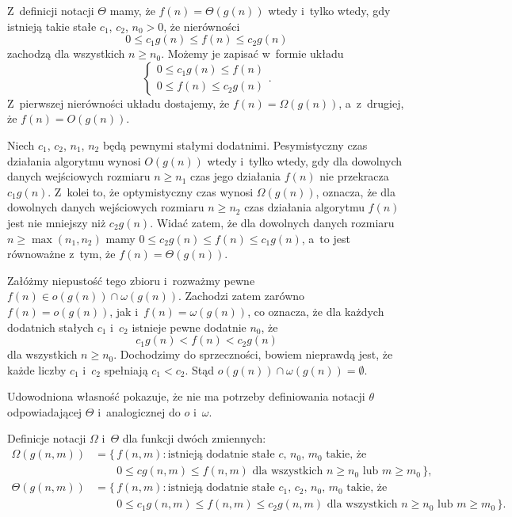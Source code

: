 \exercise %
Z~definicji notacji $\Theta$ mamy, że $f(n)=\Theta(g(n))$ wtedy i~tylko wtedy, gdy istnieją takie stałe $c_1$, $c_2$, $n_0>0$, że nierówności
\[
	0 \le c_1g(n) \le f(n) \le c_2g(n)
\]
zachodzą dla wszystkich $n\ge n_0$.
Możemy je zapisać w~formie układu
\[
	\begin{cases}
		0 \le c_1g(n) \le f(n) \\
		0 \le f(n) \le c_2g(n)
	\end{cases}.
\]
Z~pierwszej nierówności układu dostajemy, że $f(n)=\Omega(g(n))$, a~z~drugiej, że $f(n)=O(g(n))$.

\exercise %
Niech $c_1$, $c_2$, $n_1$, $n_2$ będą pewnymi stałymi dodatnimi.
Pesymistyczny czas działania algorytmu wynosi $O(g(n))$ wtedy i~tylko wtedy, gdy dla dowolnych danych wejściowych rozmiaru $n\ge n_1$ czas jego działania $f(n)$ nie przekracza $c_1g(n)$.
Z~kolei to, że optymistyczny czas wynosi $\Omega(g(n))$, oznacza, że dla dowolnych danych wejściowych rozmiaru $n\ge n_2$ czas działania algorytmu $f(n)$ jest nie mniejszy niż $c_2g(n)$.
Widać zatem, że dla dowolnych danych rozmiaru $n\ge\max(n_1,n_2)$ mamy $0\le c_2g(n)\le f(n)\le c_1g(n)$, a~to jest równoważne z~tym, że $f(n)=\Theta(g(n))$.

\exercise %
Załóżmy niepustość tego zbioru i~rozważmy pewne $f(n)\in o(g(n))\cap\omega(g(n))$.
Zachodzi zatem zarówno $f(n)=o(g(n))$, jak i~$f(n)=\omega(g(n))$, co oznacza, że dla każdych dodatnich stałych $c_1$ i~$c_2$ istnieje pewne dodatnie $n_0$, że
\[
	c_1g(n) < f(n) < c_2g(n)
\]
dla wszystkich $n\ge n_0$.
Dochodzimy do sprzeczności, bowiem nieprawdą jest, że każde liczby $c_1$ i~$c_2$ spełniają $c_1<c_2$.
Stąd $o(g(n))\cap\omega(g(n))=\emptyset$.

Udowodniona własność pokazuje, że nie ma potrzeby definiowania notacji $\theta$ odpowiadającej $\Theta$ i~analogicznej do $o$ i~$\omega$.

\exercise %

\noindent Definicje notacji $\Omega$ i~$\Theta$ dla funkcji dwóch zmiennych:
\[
	\begin{split}
		\Omega(g(n,m)) &= \bigl\{\,f(n,m):\text{istnieją dodatnie stałe $c$, $n_0$, $m_0$ takie, że} \\
		&\qquad 0 \le cg(n,m) \le f(n,m) \text{ dla wszystkich $n \ge n_0$ lub $m \ge m_0$}\,\bigr\}, \\[2mm]
		\Theta(g(n,m)) &= \bigl\{\,f(n,m):\text{istnieją dodatnie stałe $c_1$, $c_2$, $n_0$, $m_0$ takie, że} \\
		&\qquad 0 \le c_1g(n,m) \le f(n,m) \le c_2g(n,m) \text{ dla wszystkich $n \ge n_0$ lub $m \ge m_0$}\,\bigr\}.
	\end{split}
\]


